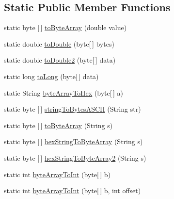 \subsection*{Static Public Member Functions}
\begin{DoxyCompactItemize}
\item 
static byte \mbox{[}$\,$\mbox{]} \hyperlink{classcom_1_1eneri_1_1scorpio__metertool_1_1bus_1_1_conversions_a67cbf40f75c6052c1ebfa606718859f7}{to\+Byte\+Array} (double value)
\item 
static double \hyperlink{classcom_1_1eneri_1_1scorpio__metertool_1_1bus_1_1_conversions_ae9b50f24d540845dacc8d2c53530a58b}{to\+Double} (byte\mbox{[}$\,$\mbox{]} bytes)
\item 
static double \hyperlink{classcom_1_1eneri_1_1scorpio__metertool_1_1bus_1_1_conversions_ae02a677a804bf989319b3559d66b3d23}{to\+Double2} (byte\mbox{[}$\,$\mbox{]} data)
\item 
static long \hyperlink{classcom_1_1eneri_1_1scorpio__metertool_1_1bus_1_1_conversions_a5e0e4b87231a8d25296608a8da2fdf3d}{to\+Long} (byte\mbox{[}$\,$\mbox{]} data)
\item 
static String \hyperlink{classcom_1_1eneri_1_1scorpio__metertool_1_1bus_1_1_conversions_a8f5b097ee84ed3857a352f516989d8d6}{byte\+Array\+To\+Hex} (byte\mbox{[}$\,$\mbox{]} a)
\item 
static byte \mbox{[}$\,$\mbox{]} \hyperlink{classcom_1_1eneri_1_1scorpio__metertool_1_1bus_1_1_conversions_a2a91e1c30520ecdc3d890d140a984e1f}{string\+To\+Bytes\+A\+S\+C\+II} (String str)
\item 
static byte \mbox{[}$\,$\mbox{]} \hyperlink{classcom_1_1eneri_1_1scorpio__metertool_1_1bus_1_1_conversions_a589490cc08cd2ec8ec19653c021c3bbf}{to\+Byte\+Array} (String s)
\item 
static byte \mbox{[}$\,$\mbox{]} \hyperlink{classcom_1_1eneri_1_1scorpio__metertool_1_1bus_1_1_conversions_a8491fcaa2405603cc5d6ac37bfd8f6d2}{hex\+String\+To\+Byte\+Array} (String s)
\item 
static byte \mbox{[}$\,$\mbox{]} \hyperlink{classcom_1_1eneri_1_1scorpio__metertool_1_1bus_1_1_conversions_a68334fd13cf4c075fc383879e4f8bcc4}{hex\+String\+To\+Byte\+Array2} (String s)
\item 
static int \hyperlink{classcom_1_1eneri_1_1scorpio__metertool_1_1bus_1_1_conversions_a2d101619f7085decfa65f7f849c4839c}{byte\+Array\+To\+Int} (byte\mbox{[}$\,$\mbox{]} b)
\item 
static int \hyperlink{classcom_1_1eneri_1_1scorpio__metertool_1_1bus_1_1_conversions_aa618469ff050daf476d74aac800608d2}{byte\+Array\+To\+Int} (byte\mbox{[}$\,$\mbox{]} b, int offset)

\end{DoxyCompactItemize}
